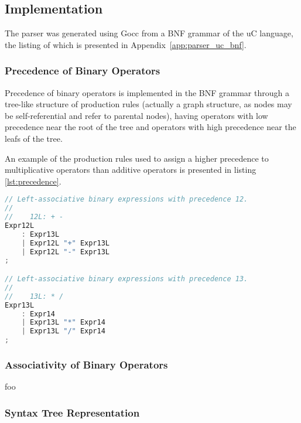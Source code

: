 \subsection{Implementation}

The parser was generated using Gocc from a BNF grammar of the uC language, the listing of which is presented in Appendix~\ref{app:parser_uc_bnf}.



\subsubsection{Precedence of Binary Operators}

Precedence of binary operators is implemented in the BNF grammar through a tree-like structure of production rules (actually a graph structure, as nodes may be self-referential and refer to parental nodes), having operators with low precedence near the root of the tree and operators with high precedence near the leafs of the tree.

An example of the production rules used to assign a higher precedence to multiplicative operators than additive operators is presented in listing \ref{lst:precedence}.

\begin{lstlisting}[language=go,style=go,caption={\label{lst:precedence}Precedence of binary expressions.}]
// Left-associative binary expressions with precedence 12.
//
//    12L: + -
Expr12L
	: Expr13L
	| Expr12L "+" Expr13L
	| Expr12L "-" Expr13L
;

// Left-associative binary expressions with precedence 13.
//
//    13L: * /
Expr13L
	: Expr14
	| Expr13L "*" Expr14
	| Expr13L "/" Expr14
;
\end{lstlisting}

\subsubsection{Associativity of Binary Operators}

foo

\subsubsection{Syntax Tree Representation}


